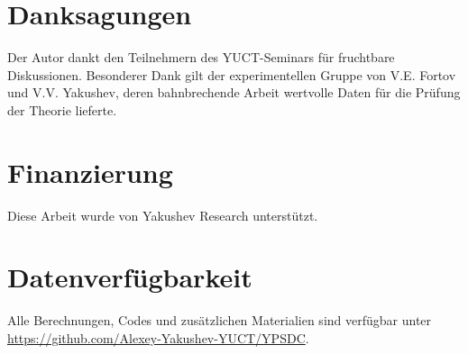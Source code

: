 \documentclass[12pt,a4paper]{article}
\theoremstyle{remark}
\begin{document}
	
	\section*{Danksagungen}
	
	Der Autor dankt den Teilnehmern des YUCT-Seminars für fruchtbare Diskussionen. Besonderer Dank gilt der experimentellen Gruppe von V.E. Fortov und V.V. Yakushev, deren bahnbrechende Arbeit wertvolle Daten für die Prüfung der Theorie lieferte.
	
	\section*{Finanzierung}
	
	Diese Arbeit wurde von Yakushev Research unterstützt.
	
	\section*{Datenverfügbarkeit}
	
	Alle Berechnungen, Codes und zusätzlichen Materialien sind verfügbar unter \url{https://github.com/Alexey-Yakushev-YUCT/YPSDC}.
	
\end{document}
